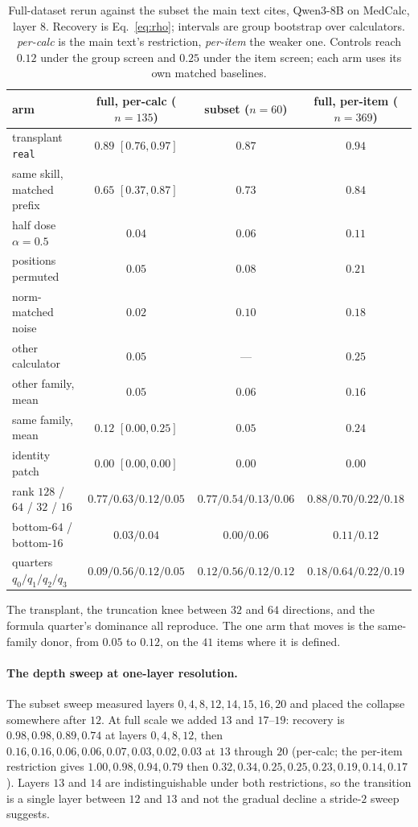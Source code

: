 \documentclass{article}
\begin{document}
\begin{table}[h]
\caption{Full-dataset rerun against the subset the main text cites, Qwen3-8B on
MedCalc, layer $8$. Recovery is Eq.~\ref{eq:rho}; intervals are group bootstrap
over calculators. \emph{per-calc} is the main text's restriction, \emph{per-item}
the weaker one. Controls reach $0.12$ under the group screen and $0.25$ under
the item screen; each arm uses its own matched baselines.}
\label{tab:fullscale}
\centering
\small
\begin{tabular}{lccc}
\toprule
arm & full, per-calc ($n=135$) & subset ($n=60$) & full, per-item ($n=369$) \\
\midrule
transplant \texttt{real} & $\mathbf{0.89}$ $[0.76,0.97]$ & $0.87$ & $0.94$ \\
same skill, matched prefix & $0.65$ $[0.37,0.87]$ & $0.73$ & $0.84$ \\
\midrule
half dose $\alpha=0.5$ & $0.04$ & $0.06$ & $0.11$ \\
positions permuted & $0.05$ & $0.08$ & $0.21$ \\
norm-matched noise & $0.02$ & $0.10$ & $0.18$ \\
other calculator & $0.05$ & --- & $0.25$ \\
other family, mean & $0.05$ & $0.06$ & $0.16$ \\
same family, mean & $0.12$ $[0.00,0.25]$ & $0.05$ & $0.24$ \\
identity patch & $0.00$ $[0.00,0.00]$ & $0.00$ & $0.00$ \\
\midrule
rank $128$ / $64$ / $32$ / $16$ & $0.77/0.63/0.12/0.05$ & $0.77/0.54/0.13/0.06$ & $0.88/0.70/0.22/0.18$ \\
bottom-$64$ / bottom-$16$ & $0.03/0.04$ & $0.00/0.06$ & $0.11/0.12$ \\
quarters $q_0/q_1/q_2/q_3$ & $0.09/\mathbf{0.56}/0.12/0.05$ & $0.12/0.56/0.12/0.12$ & $0.18/0.64/0.22/0.19$ \\
\bottomrule
\end{tabular}
\end{table}

The transplant, the truncation knee between $32$ and $64$ directions, and the
formula quarter's dominance all reproduce. The one arm that moves is the
same-family donor, from $0.05$ to $0.12$, on the $41$ items where it is defined.

\paragraph{The depth sweep at one-layer resolution.} The subset sweep measured
layers $0,4,8,12,14,15,16,20$ and placed the collapse somewhere after $12$.
At full scale we added $13$ and $17$--$19$:
recovery is $0.98,0.98,0.89,0.74$ at layers $0,4,8,12$, then
$0.16,0.16,0.06,0.06,0.07,0.03,0.02,0.03$ at $13$ through $20$ (per-calc; the
per-item restriction gives $1.00,0.98,0.94,0.79$ then
$0.32,0.34,0.25,0.25,0.23,0.19,0.14,0.17$). Layers $13$ and $14$ are
indistinguishable under both restrictions, so the transition is a single layer
between $12$ and $13$ and not the gradual decline a stride-$2$ sweep suggests.
\end{document}
